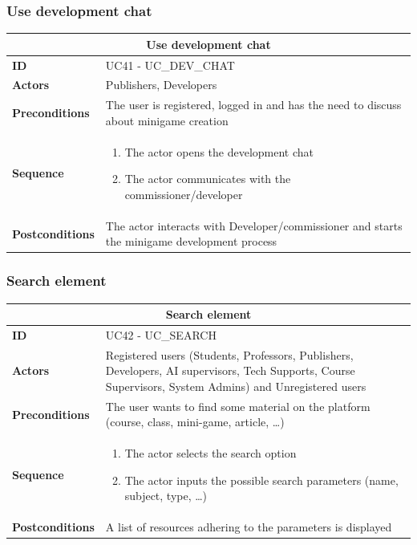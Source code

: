 \subsubsection{Use development chat}
\begin{tabular}{|m{2.5cm}|m{8cm}|}
	\hline
	\multicolumn{2}{|c|}{Use development chat} \\
	\hline
	\textbf{ID} & UC41 - UC\_DEV\_CHAT \\
	\hline
	\textbf{Actors} & Publishers, Developers \\
	\hline
	\textbf{Preconditions} & The user is registered, logged in and has the need to discuss about minigame creation \\
	\hline
	\textbf{Sequence} & 
	\begin{enumerate}
		\item The actor opens the development chat
		\item The actor communicates with the commissioner/developer
	\end{enumerate} \\
	\hline
	\textbf{Postconditions} & The actor interacts with Developer/commissioner and starts the minigame development process \\
	\hline
\end{tabular}

\subsubsection{Search element}
\begin{tabular}{|m{2.5cm}|m{8cm}|}
	\hline
	\multicolumn{2}{|c|}{Search element} \\
	\hline
	\textbf{ID} & UC42 - UC\_SEARCH \\
	\hline
	\textbf{Actors} & Registered users (Students, Professors, Publishers, Developers, AI supervisors, Tech Supports, Course Supervisors, System Admins) and Unregistered users \\
	\hline
	\textbf{Preconditions} & The user wants to find some material on the platform (course, class, mini-game, article, …) \\
	\hline
	\textbf{Sequence} & 
	\begin{enumerate}
		\item The actor selects the search option
		\item The actor inputs the possible search parameters (name, subject, type, …)
	\end{enumerate} \\
	\hline
	\textbf{Postconditions} & A list of resources adhering to the parameters is displayed \\
	\hline
\end{tabular}

